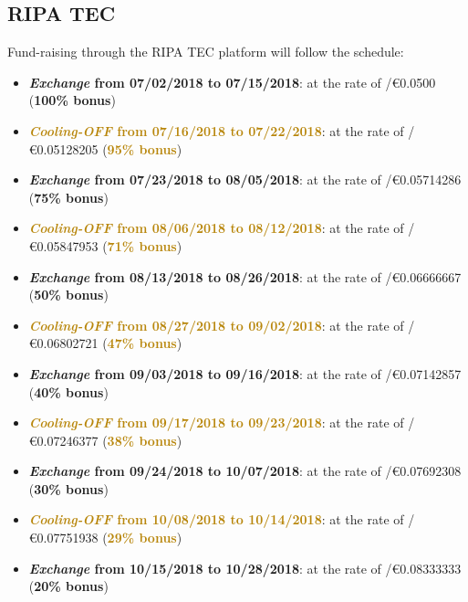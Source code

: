 \documentclass[11pt,fleqn]{book} %
\begin{document}
\subsection{RIPA TEC}
Fund-raising through the RIPA TEC platform will follow the schedule:
\begin{itemize}
	\item \textcolor{airforceblue}{\textbf{\textit{Exchange} from 07/02/2018 to 07/15/2018}}: at the rate of \PHP/\euro0.0500 (\textcolor{airforceblue}{\textbf{100\% bonus}})
	\item \textcolor{darkgoldenrod}{\textbf{\textit{Cooling-OFF} from 07/16/2018 to 07/22/2018}}: 
	at the rate of \PHP/\euro0.05128205 (\textcolor{darkgoldenrod}{\textbf{95\% bonus}})
	\item \textcolor{airforceblue}{\textbf{\textit{Exchange} from 07/23/2018 to 08/05/2018}}: at the rate of \PHP/\euro0.05714286 (\textcolor{airforceblue}{\textbf{75\% bonus}})
	\item \textcolor{darkgoldenrod}{\textbf{\textit{Cooling-OFF} from 08/06/2018 to 08/12/2018}}: 
	at the rate of \PHP/\euro0.05847953 (\textcolor{darkgoldenrod}{\textbf{71\% bonus}})
	\item \textcolor{airforceblue}{\textbf{\textit{Exchange} from 08/13/2018 to 08/26/2018}}: at the rate of \PHP/\euro0.06666667 (\textcolor{airforceblue}{\textbf{50\% bonus}})
	\item \textcolor{darkgoldenrod}{\textbf{\textit{Cooling-OFF} from 08/27/2018 to 09/02/2018}}: 
	at the rate of \PHP/\euro0.06802721 (\textcolor{darkgoldenrod}{\textbf{47\% bonus}})
	\item \textcolor{airforceblue}{\textbf{\textit{Exchange} from 09/03/2018 to 09/16/2018}}: at the rate of \PHP/\euro0.07142857 (\textcolor{airforceblue}{\textbf{40\% bonus}})
	\item \textcolor{darkgoldenrod}{\textbf{\textit{Cooling-OFF} from 09/17/2018 to 09/23/2018}}: 
	at the rate of \PHP/\euro0.07246377 (\textcolor{darkgoldenrod}{\textbf{38\% bonus}})
	\item \textcolor{airforceblue}{\textbf{\textit{Exchange} from 09/24/2018 to 10/07/2018}}: at the rate of \PHP/\euro0.07692308 (\textcolor{airforceblue}{\textbf{30\% bonus}})
	\item \textcolor{darkgoldenrod}{\textbf{\textit{Cooling-OFF} from 10/08/2018 to 10/14/2018}}: 
	at the rate of \PHP/\euro0.07751938 (\textcolor{darkgoldenrod}{\textbf{29\% bonus}})
	\item \textcolor{airforceblue}{\textbf{\textit{Exchange} from 10/15/2018 to 10/28/2018}}: at the rate of \PHP/\euro0.08333333 (\textcolor{airforceblue}{\textbf{20\% bonus}})

\end{itemize}
\end{document}
